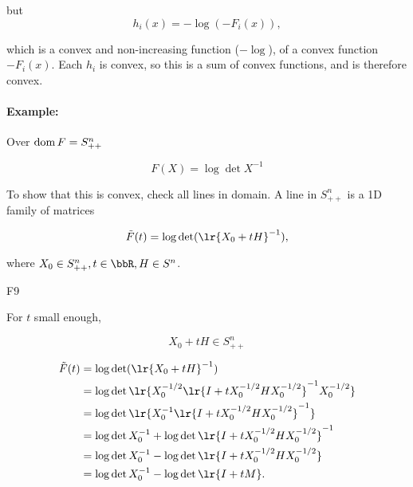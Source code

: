 but
\begin{dmath}\label{eqn:convexOptimizationLecture8:340}
h_i(x) = -\log(-F_i(x)),
\end{dmath}

which is a convex and non-increasing function (\(-\log\)), of a convex function \( -F_i(x) \).  Each 
\( h_i \) is convex, so this is a sum of convex functions, and is therefore convex.

\paragraph{Example:}

Over \( \operatorname{dom} F = S^n_{++} \)

\begin{dmath}\label{eqn:convexOptimizationLecture8:360}
F(X) = \log \det X^{-1}
\end{dmath}

To show that this is convex, check all lines in domain.  A line in \( S^n_{++} \) is a 1D family of matrices

\begin{dmath}\label{eqn:convexOptimizationLecture8:380}
\tilde{F}(t) = \log \det( \lr{X_0 + t H}^{-1} ),
\end{dmath}

where \( X_0 \in S^n_{++}, t \in \bbR, H \in S^n \).

F9

For \( t \) small enough,

\begin{dmath}\label{eqn:convexOptimizationLecture8:400}
X_0 + t H \in S^n_{++}
\end{dmath}

\begin{dmath}\label{eqn:convexOptimizationLecture8:420}
\begin{aligned}
\tilde{F}(t)
&= \log \det( \lr{X_0 + t H}^{-1} ) \\
&= \log \det\lr{ X_0^{-1/2} \lr{I + t X_0^{-1/2} H X_0^{-1/2} }^{-1} X_0^{-1/2} } \\
&= \log \det\lr{ X_0^{-1} \lr{I + t X_0^{-1/2} H X_0^{-1/2} }^{-1} } \\
&= \log \det X_0^{-1} + \log\det \lr{I + t X_0^{-1/2} H X_0^{-1/2} }^{-1} \\
&= \log \det X_0^{-1} - \log\det \lr{I + t X_0^{-1/2} H X_0^{-1/2} } \\
&= \log \det X_0^{-1} - \log\det \lr{I + t M }.
\end{aligned}
\end{dmath}

